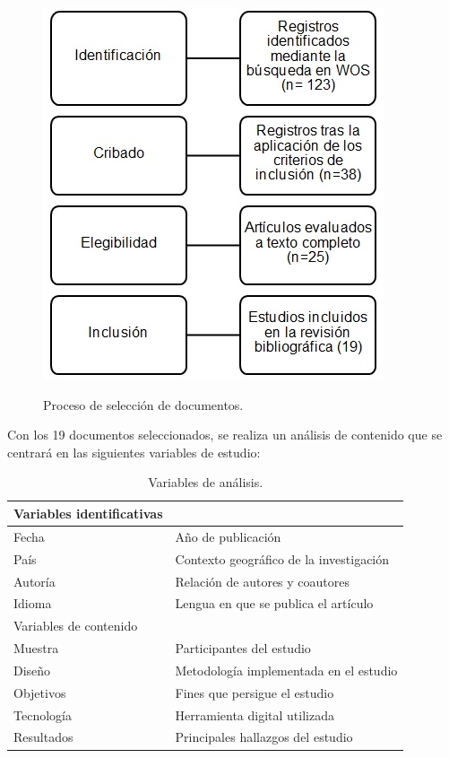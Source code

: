 \documentclass[spanish]{textolivre}
\begin{document}
\begin{figure}[htbp]
\centering
\caption{Proceso de selección de documentos.}
\begin{minipage}{.6\textwidth}
\includegraphics[width=\textwidth]{figura 01.jpg}
\label{Figura01}
\end{minipage}
\end{figure}

Con los 19 documentos seleccionados, se realiza un análisis de contenido que se centrará en las siguientes variables de estudio:

\begin{table}[h!]
\centering
\begin{threeparttable}
\caption{Variables de análisis.}
\begin{tabular}{ll}
\toprule
Variables identificativas \\
\midrule
Fecha & Año de publicación  \\
País & Contexto geográfico de la investigación \\
Autoría & Relación de autores y coautores \\
Idioma & Lengua en que se publica el artículo \\
\toprule
Variables de contenido \\
\midrule
Muestra & Participantes del estudio \\
Diseño & Metodología implementada en el estudio \\
Objetivos & Fines que persigue el estudio \\
Tecnología & Herramienta digital utilizada \\
Resultados & Principales hallazgos del estudio \\
\bottomrule
\end{tabular}
\label{Tabla02}
\end{threeparttable}
\end{table}
\end{document}
